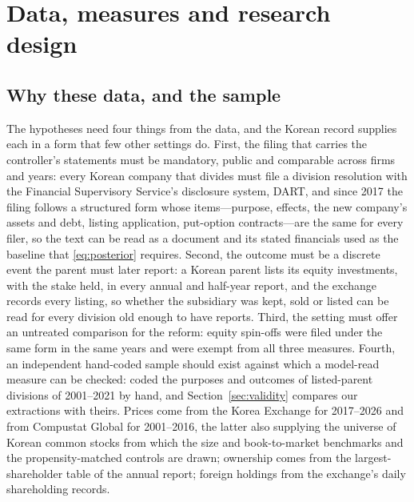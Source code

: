 \section{Data, measures and research design}\label{sec:data}

\subsection{Why these data, and the sample}\label{sec:sample}

The hypotheses need four things from the data, and the Korean record supplies each in a form that few other settings do. First, the filing that carries the controller's statements must be mandatory, public and comparable across firms and years: every Korean company that divides must file a division resolution with the Financial Supervisory Service's disclosure system, DART, and since 2017 the filing follows a structured form whose items---purpose, effects, the new company's assets and debt, listing application, put-option contracts---are the same for every filer, so the text can be read as a document and its stated financials used as the baseline that \eqref{eq:posterior} requires. Second, the outcome must be a discrete event the parent must later report: a Korean parent lists its equity investments, with the stake held, in every annual and half-year report, and the exchange records every listing, so whether the subsidiary was kept, sold or listed can be read for every division old enough to have reports. Third, the setting must offer an untreated comparison for the reform: equity spin-offs were filed under the same form in the same years and were exempt from all three measures. Fourth, an independent hand-coded sample should exist against which a model-read measure can be checked:  coded the purposes and outcomes of \KLN{} listed-parent divisions of 2001--2021 by hand, and Section~\ref{sec:validity} compares our extractions with theirs. Prices come from the Korea Exchange for 2017--2026 and from Compustat Global for 2001--2016, the latter also supplying the universe of Korean common stocks from which the size and book-to-market benchmarks and the propensity-matched controls are drawn; ownership comes from the largest-shareholder table of the annual report; foreign holdings from the exchange's daily shareholding records.

